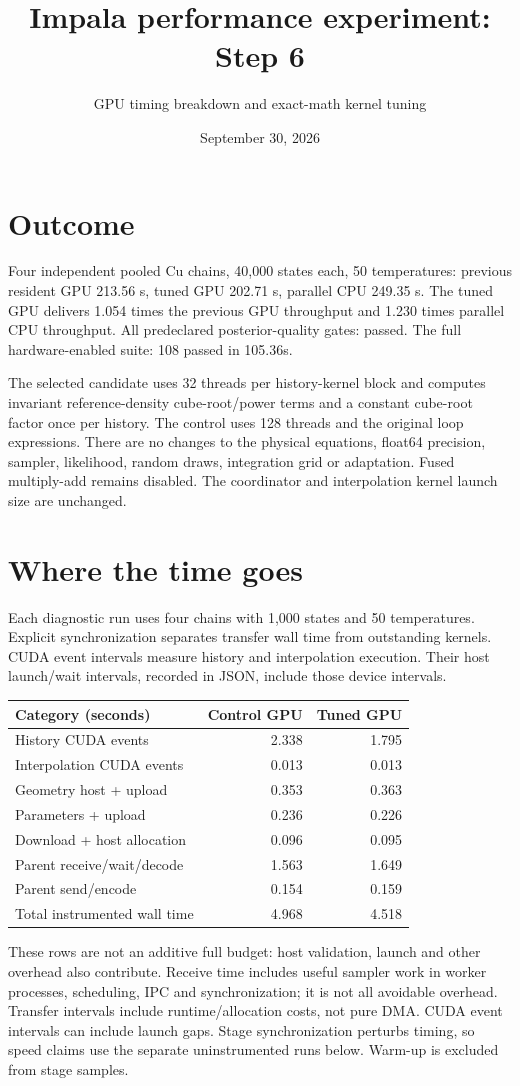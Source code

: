 \documentclass[11pt]{article}
\title{Impala performance experiment: Step 6}
\author{GPU timing breakdown and exact-math kernel tuning}
\date{September 30, 2026}
\begin{document}
\maketitle
\section*{Outcome}
Four independent pooled Cu chains, 40,000 states each, 50 temperatures:
previous resident GPU 213.56 s, tuned GPU 202.71 s, parallel CPU 249.35 s.
The tuned GPU delivers 1.054 times the previous GPU throughput and
1.230 times parallel CPU throughput. All predeclared posterior-quality gates:
passed. The full hardware-enabled suite: 108 passed in 105.36s.

The selected candidate uses 32 threads per history-kernel block and computes
invariant reference-density cube-root/power terms and a constant cube-root factor
once per history. The control uses 128 threads and the original loop expressions.
There are no changes to the physical equations, float64 precision, sampler,
likelihood, random draws, integration grid or adaptation. Fused multiply-add
remains disabled. The coordinator and interpolation kernel launch size are unchanged.
\section*{Where the time goes}
Each diagnostic run uses four chains with 1,000 states and 50 temperatures.
Explicit synchronization separates transfer wall time from outstanding kernels.
CUDA event intervals measure history and interpolation execution. Their host
launch/wait intervals, recorded in JSON, include those device intervals.
\begin{center}\begin{tabular}{lrr}\toprule
Category (seconds) & Control GPU & Tuned GPU\\\midrule
History CUDA events & 2.338 & 1.795\\
Interpolation CUDA events & 0.013 & 0.013\\
Geometry host + upload & 0.353 & 0.363\\
Parameters + upload & 0.236 & 0.226\\
Download + host allocation & 0.096 & 0.095\\
Parent receive/wait/decode & 1.563 & 1.649\\
Parent send/encode & 0.154 & 0.159\\
Total instrumented wall time & 4.968 & 4.518\\
\bottomrule\end{tabular}\end{center}
These rows are not an additive full budget: host validation, launch and other
overhead also contribute. Receive time includes useful sampler work in worker
processes, scheduling, IPC and synchronization; it is not all avoidable overhead.
Transfer intervals include runtime/allocation costs, not pure DMA. CUDA event
intervals can include launch gaps. Stage synchronization perturbs timing, so
speed claims use the separate uninstrumented runs below. Warm-up is excluded
from stage samples.
\end{document}
